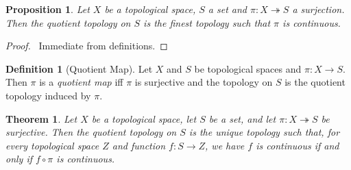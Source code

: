 \documentclass{book}
\let\qed\relax
\newtheorem{prop}[ax]{Proposition}
\newtheorem{thm}[ax]{Theorem}
\theoremstyle{definition}
\newtheorem{df}[ax]{Definition}
\begin{document}
\begin{prop}
Let $X$ be a topological space, $S$ a set and $\pi : X \twoheadrightarrow S$ a surjection. Then the quotient topology on $S$ is the finest topology such that $\pi$ is continuous.
\end{prop}

\begin{proof}
\pf\ Immediate from definitions. \qed
\end{proof}

\begin{df}[Quotient Map]
Let $X$ and $S$ be topological spaces and $\pi : X \rightarrow S$. Then $\pi$ is a \emph{quotient map} iff $\pi$ is surjective and the topology on $S$ is the quotient topology induced by $\pi$.
\end{df}

\begin{thm}
Let $X$ be a topological space, let $S$ be a set, and let $\pi : X \twoheadrightarrow S$ be surjective. Then the quotient topology on $S$ is the unique topology such that, for every topological space $Z$ and function $f : S \rightarrow Z$, we have $f$ is continuous if and only if $f \circ \pi$ is continuous.
\end{thm}
\end{document}

